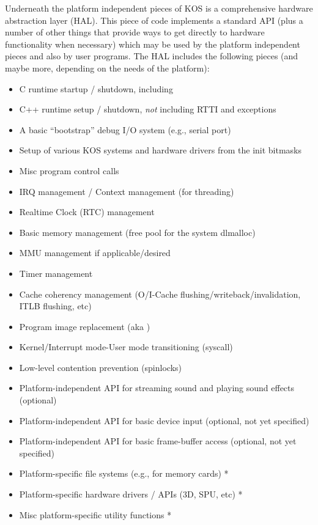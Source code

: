 \documentclass[english]{report}
\begin{document}
Underneath the platform independent pieces of KOS is a comprehensive
hardware abstraction layer (HAL). This piece of code implements a
standard API (plus a number of other things that provide ways to get
directly to hardware functionality when necessary) which may be used
by the platform independent pieces and also by user programs. The
HAL includes the following pieces (and maybe more, depending on the
needs of the platform):

\begin{itemize}
\item C runtime startup / shutdown, including 
\item C++ runtime setup / shutdown, \emph{not} including RTTI and exceptions
\item A basic ``bootstrap'' debug I/O system (e.g., serial port)
\item Setup of various KOS systems and hardware drivers from the init bitmasks
\item Misc program control calls
\item IRQ management / Context management (for threading)
\item Realtime Clock (RTC) management
\item Basic memory management (free pool for the system dlmalloc)
\item MMU management if applicable/desired
\item Timer management
\item Cache coherency management (O/I-Cache flushing/writeback/invalidation, ITLB flushing, etc)
\item Program image replacement (aka )
\item Kernel/Interrupt mode-User mode transitioning (syscall)
\item Low-level contention prevention (spinlocks)
\item Platform-independent API for streaming sound and playing sound effects (optional)
\item Platform-independent API for basic device input (optional, not yet specified)
\item Platform-independent API for basic frame-buffer access (optional, not yet specified)
\item Platform-specific file systems (e.g., for memory cards) *
\item Platform-specific hardware drivers / APIs (3D, SPU, etc) *
\item Misc platform-specific utility functions *
\end{itemize}
\end{document}
